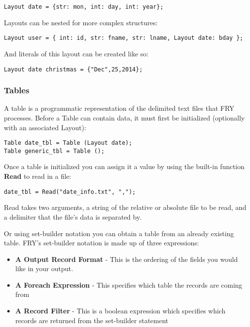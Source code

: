 \documentclass{article}
\begin{document}
\begin{lstlisting}
Layout date = {str: mon, int: day, int: year};
\end{lstlisting}

Layouts can be nested for more complex structures:
\begin{lstlisting}
Layout user = { int: id, str: fname, str: lname, Layout date: bday };
\end{lstlisting}

And literals of this layout can be created like so:
\begin{lstlisting}
Layout date christmas = {"Dec",25,2014};
\end{lstlisting}

\subsubsection{Tables}
\label{sec:Tables}
A table is a programmatic representation of the delimited text files that FRY processes. Before a Table can contain data, it must first be initialized (optionally with an associated Layout):

\begin{lstlisting}
Table date_tbl = Table (Layout date);
Table generic_tbl = Table ();
\end{lstlisting}

Once a table is initialized you can assign it a value by using the built-in function \textbf{Read} to read in a file:

\begin{lstlisting}
date_tbl = Read("date_info.txt", ",");
\end{lstlisting}

Read takes two arguments, a string of the relative or absolute file to be read, and a delimiter that the file's data is separated by.

Or using set-builder notation you can obtain a table from an already existing table. FRY's set-builder notation is made up of three expressions:
\begin{itemize}
\item \textbf{A Output Record Format} - This is the ordering of the fields you would like in your output.
\item \textbf{A Foreach Expression} - This specifies which table the records are coming from
\item \textbf{A Record Filter} - This is a boolean expression which specifies which records are returned from the set-builder statement
\end{itemize}
\end{document}
